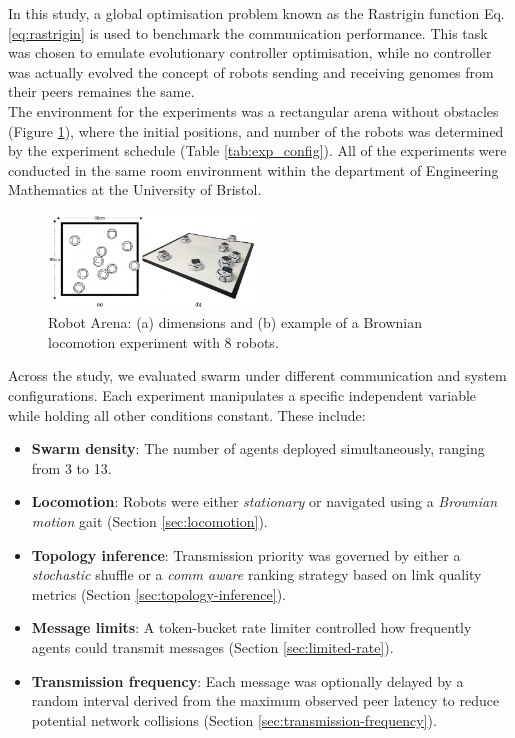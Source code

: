 \documentclass[conference]{IEEEtran}
\begin{document}
In this study, a global optimisation problem known as the Rastrigin function Eq. \ref{eq:rastrigin} is used to benchmark the communication performance. This task was chosen to emulate evolutionary controller optimisation, while no controller was actually evolved the concept of robots sending and receiving genomes from their peers remaines the same.\\ 

The environment for the experiments was a rectangular arena without obstacles (Figure \ref{fig:arena}), where the initial positions, and number of the robots was determined by the experiment schedule (Table \ref{tab:exp_config}). All of the experiments were conducted in the same room environment within the department of Engineering Mathematics at the University of Bristol.

\begin{figure}[H]
    \centering
    \includegraphics[width=0.49\textwidth]{arena.png}
    \caption{Robot Arena: (a) dimensions and (b) example of a Brownian locomotion experiment with 8 robots.}
    \label{fig:arena}
\end{figure}

Across the study, we evaluated swarm under different communication and system configurations. Each experiment manipulates a specific independent variable while holding all other conditions constant. These include:\\

\begin{itemize}
  \item \textbf{Swarm density}: The number of agents deployed simultaneously, ranging from 3 to 13.
  \item \textbf{Locomotion}: Robots were either \emph{stationary} or navigated using a \emph{Brownian motion} gait (Section \ref{sec:locomotion}).
  \item \textbf{Topology inference}: Transmission priority was governed by either a \emph{stochastic} shuffle or a \emph{comm aware} ranking strategy based on link quality metrics (Section \ref{sec:topology-inference}).
  \item \textbf{Message limits}: A token-bucket rate limiter controlled how frequently agents could transmit messages (Section \ref{sec:limited-rate}).
  \item \textbf{Transmission frequency}: Each message was optionally delayed by a random interval derived from the maximum observed peer latency to reduce potential network collisions (Section \ref{sec:transmission-frequency}).
\end{itemize}
\end{document}
